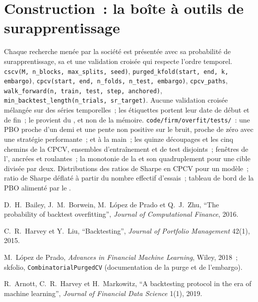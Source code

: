 \section{Construction~: la boîte à outils de surapprentissage}\label{bld:rs:overfitting:overfit}

\begin{build}
 Chaque recherche menée par la société est présentée avec sa probabilité de surapprentissage, sa  et une validation croisée qui respecte
l'ordre temporel.
 \texttt{cscv(M, n\_blocks, max\_splits, seed)}, \texttt{purged\_kfold(start, end, k, embargo)}, \texttt{cpcv(start, end, n\_folds, n\_test, embargo)},
\texttt{cpcv\_paths}, \texttt{walk\_forward(n, train, test, step, anchored)}, \texttt{min\_backtest\_length(n\_trials, sr\_target)}.
 Aucune validation croisée mélangée sur des séries temporelles~; les étiquettes portent leur date de début et de fin~; le  provient du , et non de la mémoire.
 \texttt{code/firm/overfit/tests/}~: une PBO proche d'un demi et une pente non positive sur le bruit, proche de zéro avec une stratégie performante~;  et
 à la main~; les quinze découpages et les cinq chemins de la CPCV, ensembles d'entraînement et de test disjoints~; fenêtres de l', ancrées et roulantes~; la monotonie de la  et son quadruplement pour une cible divisée par deux.
 Distributions des ratios de Sharpe en CPCV pour un modèle~; ratio de Sharpe déflaté à partir du nombre effectif d'essais~; tableau de bord de la PBO alimenté par le .
\end{build}

\begin{omsources}
\item D.~H.~Bailey, J.~M.~Borwein, M.~López de Prado et Q.~J.~Zhu, ``The probability of backtest overfitting'', \emph{Journal of Computational Finance}, 2016.
\item C.~R.~Harvey et Y.~Liu, ``Backtesting'', \emph{Journal of Portfolio Management} 42(1), 2015.
\item M.~López de Prado, \emph{Advances in Financial Machine Learning}, Wiley, 2018~; skfolio, \texttt{CombinatorialPurgedCV} (documentation de la purge et de l'embargo).
\item R.~Arnott, C.~R.~Harvey et H.~Markowitz, ``A backtesting protocol in the era of machine learning'', \emph{Journal of Financial Data Science} 1(1), 2019.
\end{omsources}

